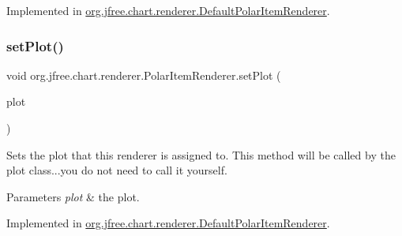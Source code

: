 Implemented in \mbox{\hyperlink{classorg_1_1jfree_1_1chart_1_1renderer_1_1_default_polar_item_renderer_a57bdfb049e0c886624471fe2167fba2e}{org.\+jfree.\+chart.\+renderer.\+Default\+Polar\+Item\+Renderer}}.

\mbox{\label{interfaceorg_1_1jfree_1_1chart_1_1renderer_1_1_polar_item_renderer_a1b4dbb3579dbdf195cb5dc0901d387f5}} 
\subsubsection{\texorpdfstring{set\+Plot()}{setPlot()}}
{\footnotesize\ttfamily void org.\+jfree.\+chart.\+renderer.\+Polar\+Item\+Renderer.\+set\+Plot (\begin{DoxyParamCaption}\item[{\mbox{\hyperlink{classorg_1_1jfree_1_1chart_1_1plot_1_1_polar_plot}{Polar\+Plot}}}]{plot }\end{DoxyParamCaption})}

Sets the plot that this renderer is assigned to. This method will be called by the plot class...you do not need to call it yourself.


\begin{DoxyParams}{Parameters}
{\em plot} & the plot. \\
\hline
\end{DoxyParams}


Implemented in \mbox{\hyperlink{classorg_1_1jfree_1_1chart_1_1renderer_1_1_default_polar_item_renderer_ad296a32b8f8f8c0bd6d460204781eaea}{org.\+jfree.\+chart.\+renderer.\+Default\+Polar\+Item\+Renderer}}.

\mbox{\label{interfaceorg_1_1jfree_1_1chart_1_1renderer_1_1_polar_item_renderer_a38f9cc455c80c0b6e937bd759a62e3a2}} 

